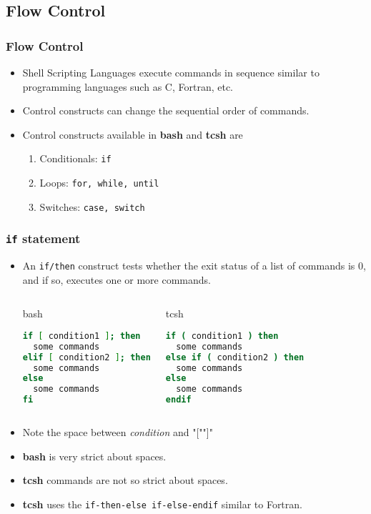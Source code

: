 \documentclass[10pt,t]{beamer}
\begin{document}
\subsection{Flow Control}
\begin{frame}
  \frametitle{Flow Control}
  \begin{itemize}
    \item Shell Scripting Languages execute commands in sequence similar to programming languages such as C, Fortran, etc.
    \item Control constructs can change the sequential order of commands.
    \item Control constructs available in \textbf{bash} and \textbf{tcsh} are
    \begin{enumerate}
        \item Conditionals: \texttt{if}
        \item Loops: \texttt{for, while, until}
        \item Switches: \texttt{case, switch}
    \end{enumerate}
  \end{itemize}
\end{frame}

\begin{frame}[fragile]
  \frametitle{\texttt{if} statement}
  \begin{itemize}
    \item An \texttt{if/then} construct tests whether the exit status of a list of commands is 0, and if so, executes one or more commands.
    \begin{columns}
      \column{5cm}
      \begin{exampleblock}{bash}
        \begin{lstlisting}[language=bash]
if [ condition1 ]; then
  some commands
elif [ condition2 ]; then
  some commands
else
  some commands
fi
        \end{lstlisting}
      \end{exampleblock}
      \column{5cm}
      \begin{block}{tcsh}
        \begin{lstlisting}[language=csh]
if ( condition1 ) then
  some commands
else if ( condition2 ) then
  some commands
else
  some commands
endif
        \end{lstlisting}
      \end{block}
    \end{columns}
  \item Note the space between \textit{condition} and "["\quad"]"
  \item \textbf{bash} is very strict about spaces.
  \item \textbf{tcsh} commands are not so strict about spaces.
  \item \textbf{tcsh} uses the \texttt{if-then-else if-else-endif} similar to Fortran.   
  \end{itemize}
\end{frame}
\end{document}
